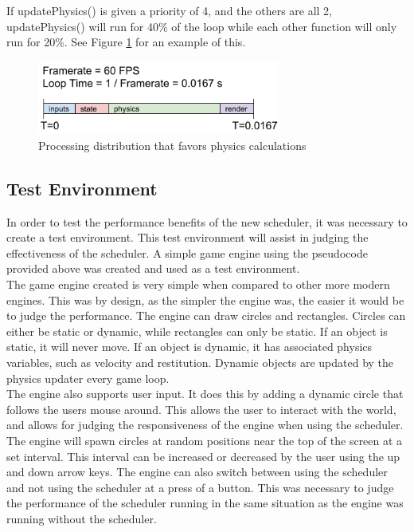 \documentclass[a4paper, 12pt]{article}
\begin{document}
        If updatePhysics() is given a priority of 4, and the others are all 2, updatePhysics() will run for 40\% of the loop while each other function will only run for 20\%. See Figure \ref{phys_priority} for an example of this.

        \begin{figure}[H]
            \includegraphics[width=8cm]{phys_priority.png}
            \centering
            \caption{Processing distribution that favors physics calculations}
            \label{phys_priority}
        \end{figure}

    \subsection{Test Environment}

        In order to test the performance benefits of the new scheduler, it was necessary to create a test environment. This test environment will assist in judging the effectiveness of the scheduler. A simple game engine using the pseudocode provided above was created and used as a test environment.
        \\

        The game engine created is very simple when compared to other more modern engines. This was by design, as the simpler the engine was, the easier it would be to judge the performance. The engine can draw circles and rectangles. Circles can either be static or dynamic, while rectangles can only be static. If an object is static, it will never move. If an object is dynamic, it has associated physics variables, such as velocity and restitution. Dynamic objects are updated by the physics updater every game loop.
        \\

        The engine also supports user input. It does this by adding a dynamic circle that follows the users mouse around. This allows the user to interact with the world, and allows for judging the responsiveness of the engine when using the scheduler. The engine will spawn circles at random positions near the top of the screen at a set interval. This interval can be increased or decreased by the user using the up and down arrow keys. The engine can also switch between using the scheduler and not using the scheduler at a press of a button. This was necessary to judge the performance of the scheduler running in the same situation as the engine was running without the scheduler. 
        \\
        
\end{document}
